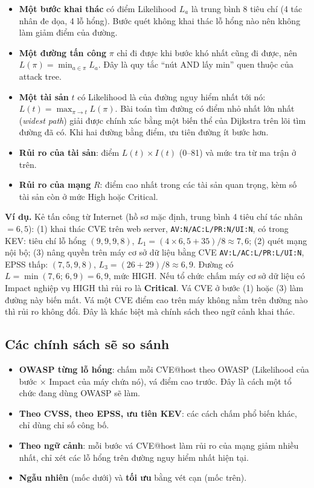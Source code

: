 \documentclass[11pt,a4paper]{article}
\begin{document}
\begin{itemize}
  \item \textbf{Một bước khai thác} có điểm Likelihood $L_a$ là trung bình 8 tiêu chí (4 tác nhân đe dọa, 4 lỗ hổng). Bước quét không khai thác lỗ hổng nào nên không làm giảm điểm của đường.
  \item \textbf{Một đường tấn công} $\pi$ chỉ đi được khi bước khó nhất cũng đi được, nên $L(\pi) = \min_{a \in \pi} L_a$. Đây là quy tắc ``nút AND lấy min'' quen thuộc của attack tree.
  \item \textbf{Một tài sản} $t$ có Likelihood là của đường nguy hiểm nhất tới nó: $L(t) = \max_{\pi \to t} L(\pi)$. Bài toán tìm đường có điểm nhỏ nhất lớn nhất (\emph{widest path}) giải được chính xác bằng một biến thể của Dijkstra trên lõi tìm đường đã có. Khi hai đường bằng điểm, ưu tiên đường ít bước hơn.
  \item \textbf{Rủi ro của tài sản}: điểm $L(t) \times I(t)$ (0--81) và mức tra từ ma trận ở trên.
  \item \textbf{Rủi ro của mạng} $R$: điểm cao nhất trong các tài sản quan trọng, kèm số tài sản còn ở mức High hoặc Critical.
\end{itemize}

\textbf{Ví dụ.} Kẻ tấn công từ Internet (hồ sơ mặc định, trung bình 4 tiêu chí tác nhân $= 6{,}5$): (1) khai thác CVE trên web server, \texttt{AV:N/AC:L/PR:N/UI:N}, có trong KEV: tiêu chí lỗ hổng $(9, 9, 9, 8)$, $L_1 = (4 \times 6{,}5 + 35)/8 \approx 7{,}6$; (2) quét mạng nội bộ; (3) nâng quyền trên máy cơ sở dữ liệu bằng CVE \texttt{AV:L/AC:L/PR:L/UI:N}, EPSS thấp: $(7, 5, 9, 8)$, $L_3 = (26 + 29)/8 \approx 6{,}9$. Đường có $L = \min(7{,}6;\,6{,}9) = 6{,}9$, mức HIGH. Nếu tổ chức chấm máy cơ sở dữ liệu có Impact nghiệp vụ HIGH thì rủi ro là \textbf{Critical}. Vá CVE ở bước (1) hoặc (3) làm đường này biến mất. Vá một CVE điểm cao trên máy không nằm trên đường nào thì rủi ro không đổi. Đây là khác biệt mà chính sách theo ngữ cảnh khai thác.

\subsection{Các chính sách sẽ so sánh}

\begin{itemize}
  \item \textbf{OWASP từng lỗ hổng}: chấm mỗi CVE@host theo OWASP (Likelihood của bước $\times$ Impact của máy chứa nó), vá điểm cao trước. Đây là cách một tổ chức đang dùng OWASP sẽ làm.
  \item \textbf{Theo CVSS, theo EPSS, ưu tiên KEV}: các cách chấm phổ biến khác, chỉ dùng chỉ số công bố.
  \item \textbf{Theo ngữ cảnh}: mỗi bước vá CVE@host làm rủi ro của mạng giảm nhiều nhất, chỉ xét các lỗ hổng trên đường nguy hiểm nhất hiện tại.
  \item \textbf{Ngẫu nhiên} (mốc dưới) và \textbf{tối ưu} bằng vét cạn (mốc trên).
\end{itemize}
\end{document}

